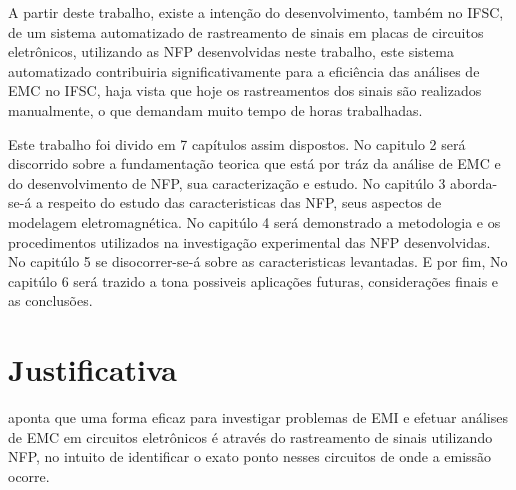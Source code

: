 

A partir deste trabalho, existe a intenção do desenvolvimento, também no IFSC, de um sistema automatizado de rastreamento de sinais em placas de circuitos eletrônicos, utilizando as NFP desenvolvidas neste trabalho, este sistema automatizado contribuiria significativamente para a eficiência das análises de EMC no IFSC, haja vista que hoje os rastreamentos dos sinais são realizados manualmente, o que demandam muito tempo de horas trabalhadas. 

Este trabalho foi divido em 7 capítulos assim dispostos. No capitulo 2 será discorrido sobre a fundamentação teorica que está por tráz da análise de EMC e do desenvolvimento de NFP, sua caracterização e estudo. No capitúlo 3 aborda-se-á a respeito do estudo das caracteristicas das NFP, seus aspectos de modelagem eletromagnética. No capitúlo 4 será demonstrado a metodologia e os procedimentos utilizados na investigação experimental das NFP desenvolvidas. No capitúlo 5 se disocorrer-se-á sobre as caracteristicas levantadas. E por fim, No capitúlo 6 será trazido a tona possiveis aplicações futuras, considerações finais e as conclusões.

\section{Justificativa}
 aponta que uma forma eficaz para investigar problemas de EMI e efetuar análises de EMC em circuitos eletrônicos é através do rastreamento de sinais utilizando NFP, no intuito de identificar o exato ponto nesses circuitos de onde a emissão ocorre. 

